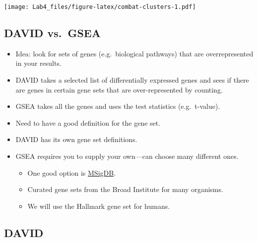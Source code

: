 \documentclass[
]{article}
\providecommand{\tightlist}{%
  \setlength{\itemsep}{0pt}\setlength{\parskip}{0pt}}
\begin{document}
\texttt{[image: Lab4\_files/figure-latex/combat-clusters-1.pdf]}

\hypertarget{david-vs.-gsea}{%
\subsection{DAVID vs.~GSEA}\label{david-vs.-gsea}}

\begin{itemize}
\tightlist
\item
  Idea: look for sets of genes (e.g.~biological pathways) that are
  overrepresented in your results.
\item
  DAVID takes a selected list of differentially expressed genes and sees
  if there are genes in certain gene sets that are over-represented by
  counting.
\item
  GSEA takes all the genes and uses the test statistics (e.g.~t-value).
\item
  Need to have a good definition for the gene set.
\item
  DAVID has its own gene set definitions.
\item
  GSEA requires you to supply your own---can choose many different ones.

  \begin{itemize}
  \tightlist
  \item
    One good option is
    \href{http://software.broadinstitute.org/gsea/msigdb/index.jsp}{MSigDB}.
  \item
    Curated gene sets from the Broad Institute for many organisms.
  \item
    We will use the Hallmark gene set for humans.
  \end{itemize}
\end{itemize}

\hypertarget{david}{%
\subsection{DAVID}\label{david}}
\end{document}

